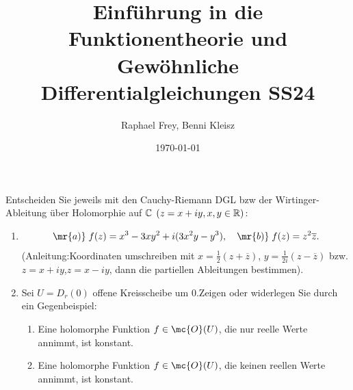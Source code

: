 \documentclass[ngerman]{report}
\title{Einführung in die Funktionentheorie und Gewöhnliche Differentialgleichungen SS24}
\author{Raphael Frey, Benni Kleisz}
\institute{Universität Tübingen}
\date{\today}
\begin{document}
    \begin{question} Entscheiden Sie jeweils mit den Cauchy-Riemann DGL bzw der Wirtinger-Ableitung über
        Holomorphie auf $\mathbb{C}$ $(z=x+iy,x,y\in\mathbb{R})$:
        \begin{enumerate}
            \item 
            \begin{align*}
                \mr{a)} \; f(z)=x^3-3xy^2+i(3x^2y-y^3), \quad \mr{b)}\;f(z)=z^2\overline{z}.
            \end{align*}
            (Anleitung:Koordinaten umschreiben mit $x=\frac{1}{2}(z+\overline{z})$, $y= \frac{1}{2i}(z-\overline{z})$ bzw. $z= x+iy$,$z=x-iy$, dann die partiellen Ableitungen bestimmen).
            \item Sei $U=D_r(0)$ offene Kreisscheibe um $0$.Zeigen oder widerlegen Sie durch ein Gegenbeispiel:
            \begin{enumerate}
                \item Eine holomorphe Funktion $f \in \mc{O}(U)$, die nur reelle Werte annimmt, ist konstant.
                \item Eine holomorphe Funktion $f \in \mc{O}(U)$, die keinen reellen Werte annimmt, ist konstant.
            \end{enumerate}
        \end{enumerate}
    \end{question}
\end{document}
